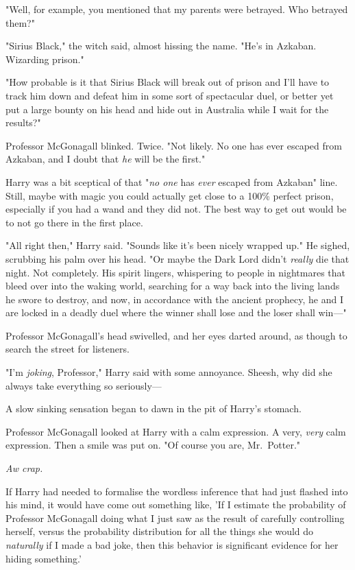 "Well, for example, you mentioned that my parents were betrayed. Who betrayed 
them?"

"Sirius Black," the witch said, almost hissing the name. "He's in Azkaban. 
Wizarding prison."

"How probable is it that Sirius Black will break out of prison and I'll have to 
track him down and defeat him in some sort of spectacular duel, or better yet 
put a large bounty on his head and hide out in Australia while I wait for the 
results?"

Professor McGonagall blinked. Twice. "Not likely. No one has ever escaped from 
Azkaban, and I doubt that \emph{he} will be the first."

Harry was a bit sceptical of that "\emph{no one} has \emph{ever} escaped from 
Azkaban" line. Still, maybe with magic you could actually get close to a 100\% 
perfect prison, especially if you had a wand and they did not. The best way to 
get out would be to not go there in the first place.

"All right then," Harry said. "Sounds like it's been nicely wrapped up." He 
sighed, scrubbing his palm over his head. "Or maybe the Dark Lord didn't 
\emph{really} die that night. Not completely. His spirit lingers, whispering to 
people in nightmares that bleed over into the waking world, searching for a way 
back into the living lands he swore to destroy, and now, in accordance with the 
ancient prophecy, he and I are locked in a deadly duel where the winner shall 
lose and the loser shall win---"

Professor McGonagall's head swivelled, and her eyes darted around, as though to 
search the street for listeners.

"I'm \emph{joking}, Professor," Harry said with some annoyance. Sheesh, why did 
she always take everything so seriously---

A slow sinking sensation began to dawn in the pit of Harry's stomach.

Professor McGonagall looked at Harry with a calm expression. A very, 
\emph{very} calm expression. Then a smile was put on. "Of course you are, 
Mr.~Potter."

\emph{Aw crap.}

If Harry had needed to formalise the wordless inference that had just flashed 
into his mind, it would have come out something like, 'If I estimate the 
probability of Professor McGonagall doing what I just saw as the result of 
carefully controlling herself, versus the probability distribution for all the 
things she would do \emph{naturally} if I made a bad joke, then this behavior 
is significant evidence for her hiding something.'

